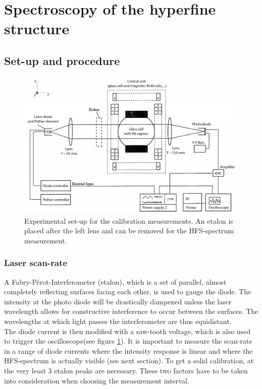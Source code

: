 \section{Spectroscopy of the hyperfine structure}
\subsection{Set-up and procedure}
\begin{figure}[htb]
	\includegraphics[width=1.0\linewidth]{graphics/calibrationsetup}
	\caption[Experimental set-up for the Calibration]{Experimental set-up for the calibration measurements. An etalon is placed after the left lens and can be removed for the HFS-spectrum measurement.\cite{anleitung}}
	\label{fig:calibration setup}
\end{figure}
\subsubsection*{Laser scan-rate}
A Fabry-Pérot-Interferometer (etalon), which is a set of parallel, almost completely reflecting surfaces facing each other, is used to gauge the diode. The intensity at the photo diode will be drastically dampened unless the laser wavelength allows for constructive interference to occur between the surfaces. The wavelengths at which light passes the interferometer are thus equidistant.\\

The diode current is then modified with a saw-tooth voltage, which is also used to trigger the oscilloscope(see figure \ref{fig:calibration setup}). It is important to measure the scan-rate in a range of diode currents where the intensity response is linear and where the HFS-spectrum is actually visible (see next section). To get a solid calibration, at the very least 3 etalon peaks are necessary. These two factors have to be taken into consideration when choosing the measurement interval.\\ 

